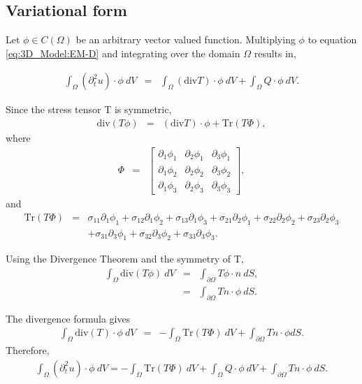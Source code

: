 \documentclass[../../main.tex]{subfiles}
\begin{document}
\subsection{Variational form}\label{ssec:3D_Model:VariationalForm}
Let $\phi \in C({\Omega})$ be an arbitrary vector valued function. Multiplying
$\phi$ to equation \eqref{eq:3D_Model:EM-D} and integrating over the domain
$\Omega$ results in, \label{sym:Cn} \label{sym:phi}

\begin{eqnarray*}
	\int_{\Omega} (\partial_t^2 u)\cdot \phi \ dV & = & \int_{\Omega} (\textrm{div} T)\cdot \phi \ dV
	+ \int_{\Omega} Q \cdot \phi \ dV.
\end{eqnarray*}

Since the stress tensor T is symmetric,
\begin{eqnarray*}
	\textrm{div}(T\phi) & = & (\textrm{div}T)\cdot \phi + \textrm{Tr}(T\Phi),
\end{eqnarray*}
where
\begin{eqnarray*}
	\Phi & = &
	\begin{bmatrix}
		\partial_1 \phi_1 & \partial_2 \phi_1 & \partial_3 \phi_1 \\
		\partial_1 \phi_2 & \partial_2 \phi_2 & \partial_3 \phi_2 \\
		\partial_1 \phi_3 & \partial_2 \phi_3 & \partial_3 \phi_3
	\end{bmatrix},
\end{eqnarray*}
and
\begin{eqnarray*}
	\textrm{Tr}(T\Phi) & = & \sigma_{11} \partial_1\phi_1 + \sigma_{12}\partial_1 \phi_2 + \sigma_{13}\partial_1 \phi_3 + \sigma_{21}\partial_2 \phi_1 + \sigma_{22}\partial_2\phi_2 + \sigma_{23}\partial_2 \phi_3 \nonumber \\ & & + \sigma_{31}\partial_3 \phi_1 + \sigma_{32}\partial_3\phi_2 + \sigma_{33}\partial_3 \phi_3. \label{Trc}
\end{eqnarray*}

Using the Divergence Theorem and the symmetry of T,
\begin{eqnarray*}
	\int_{\Omega} \textrm{div}(T\phi) \ dV & = & \int_{\partial \Omega} T\phi \cdot n \ dS,\\ & = & \int_{\partial \Omega} Tn \cdot \phi \ dS.
\end{eqnarray*}

The divergence formula gives
\begin{eqnarray*}
	\int_{\Omega} \textrm{div}(T)\cdot \phi \ dV & = & -\int_{\Omega} \textrm{Tr}(T\Phi) \ dV + \int_{\partial \Omega} Tn\cdot \phi dS.
\end{eqnarray*}
Therefore,
\begin{align*}
	\int_{\Omega} (\partial_t^2 u)\cdot \phi \ dV = -\int_{\Omega} \textrm{Tr}(T\Phi) \ dV +
	\int_{\Omega} Q\cdot\phi \ dV + \int_{\partial \Omega} Tn\cdot \phi \ dS.
\end{align*}
\end{document}
